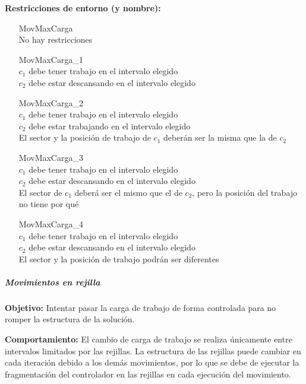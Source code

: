 \textbf{Restricciones de entorno (y nombre):}
\begin{enumerate}[align=parleft, labelsep=2cm, itemindent=5em, font=\itshape]
    \item[MovMaxCarga]\mbox{}\\No hay restricciones

    \item[MovMaxCarga\_1]\mbox{}\\
    $c_1$ debe tener trabajo en el intervalo elegido \\
    $c_2$ debe estar descansando en el intervalo elegido

    \item[MovMaxCarga\_2]\mbox{}\\
    $c_1$ debe tener trabajo en el intervalo elegido \\
    $c_2$ debe estar trabajando en el intervalo elegido \\
    El sector y la posición de trabajo de $c_1$ deberán ser la misma que la de $c_2$

    \item[MovMaxCarga\_3]\mbox{}\\
    $c_1$ debe tener trabajo en el intervalo elegido \\
    $c_2$ debe estar descansando en el intervalo elegido \\
    El sector de $c_1$ deberá ser el mismo que el de $c_2$, pero la posición del trabajo no tiene por qué

    \item[MovMaxCarga\_4]\mbox{}\\
    $c_1$ debe tener trabajo en el intervalo elegido \\
    $c_2$ debe estar descansando en el intervalo elegido \\
    El sector y la posición de trabajo podrán ser diferentes
\end{enumerate}

\subparagraph{Movimientos en rejilla}
\label{entorno:movRejilla}

\textbf{Objetivo:} Intentar pasar la carga de trabajo de forma controlada para no romper la estructura de la solución.

\textbf{Comportamiento:} El cambio de carga de trabajo se realiza únicamente entre intervalos limitados por las rejillas. La estructura de las rejillas puede cambiar en cada iteración debido a los demás movimientos, por lo que se debe de ejecutar la fragmentación del controlador en las rejillas en cada ejecución del movimiento.


